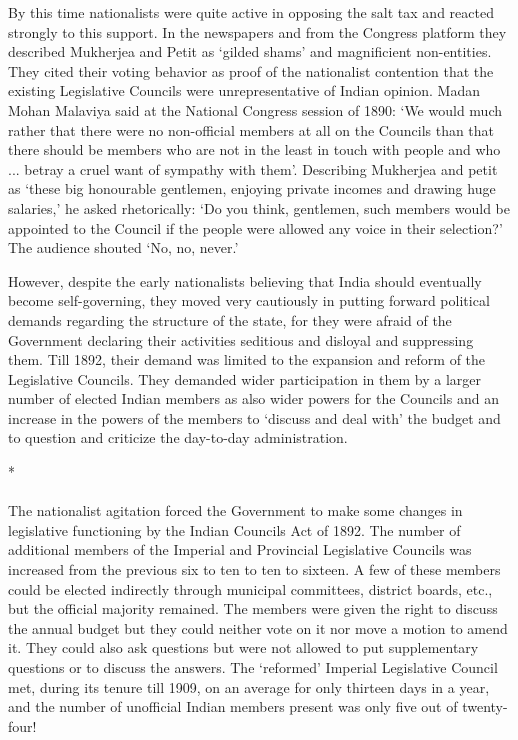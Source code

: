 By this time nationalists were quite active in opposing the salt tax and reacted strongly to this support. In the newspapers and from the Congress platform they described Mukherjea and Petit as `gilded shams' and magnificient non-entities. They cited their voting behavior as proof of the nationalist contention that the existing Legislative Councils were unrepresentative of Indian opinion. Madan Mohan Malaviya said at the National Congress session of 1890: `We would much rather that there were no non-official members at all on the Councils than that there should be members who are not in the least in touch with people and who ... betray a cruel want of sympathy with them'. Describing Mukherjea and petit as `these big honourable gentlemen, enjoying private incomes and drawing huge salaries,' he asked rhetorically: `Do you think, gentlemen, such members would be appointed to the Council if the people were allowed any voice in their selection?' The audience shouted `No, no, never.'

However, despite the early nationalists believing that India should eventually become self-governing, they moved very cautiously in putting forward political demands regarding the structure of the state, for they were afraid of the Government declaring their activities seditious and disloyal and suppressing them. Till 1892, their demand was limited to the expansion and reform of the Legislative Councils. They demanded wider participation in them by a larger number of elected Indian members as also wider powers for the Councils and an increase in the powers of the members to `discuss and deal with' the budget and to question and criticize the day-to-day administration.

\begin{center}*\end{center}

\paragraph*{}

The nationalist agitation forced the Government to make some changes in legislative functioning by the Indian Councils Act of 1892. The number of additional members of the Imperial and Provincial Legislative Councils was increased from the previous six to ten to ten to sixteen. A few of these members could be elected indirectly through municipal committees, district boards, etc., but the official majority remained. The members were given the right to discuss the annual budget but they could neither vote on it nor move a motion to amend it. They could also ask questions but were not allowed to put supplementary questions or to discuss the answers. The `reformed' Imperial Legislative Council met, during its tenure till 1909, on an average for only thirteen days in a year, and the number of unofficial Indian members present was only five out of twenty- four!

